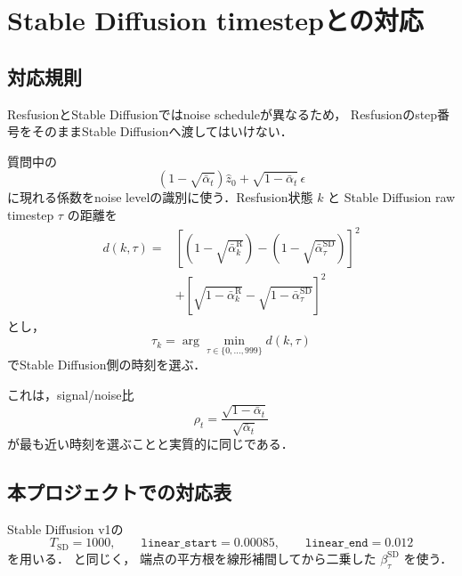 \documentclass[11pt,a4paper]{ltjsarticle}
\begin{document}
\section{Stable Diffusion timestepとの対応}

\subsection{対応規則}

ResfusionとStable Diffusionではnoise scheduleが異なるため，
Resfusionのstep番号をそのままStable Diffusionへ渡してはいけない．

質問中の
\[
  \left(1-\sqrt{\bar\alpha_t}\right)\hat z_0
  +
  \sqrt{1-\bar\alpha_t}\,\epsilon
\]
に現れる係数をnoise levelの識別に使う．Resfusion状態 \(k\) と
Stable Diffusion raw timestep \(\tau\) の距離を
\begin{equation}
\begin{aligned}
d(k,\tau)
={}&
\left[
  \left(1-\sqrt{\bar\alpha^{\mathrm R}_k}\right)
  -
  \left(1-\sqrt{\bar\alpha^{\mathrm{SD}}_\tau}\right)
\right]^2\\
&+
\left[
  \sqrt{1-\bar\alpha^{\mathrm R}_k}
  -
  \sqrt{1-\bar\alpha^{\mathrm{SD}}_\tau}
\right]^2
\end{aligned}
\label{eq:distance}
\end{equation}
とし，
\begin{equation}
\boxed{
  \tau_k
  =
  \arg\min_{\tau\in\{0,\ldots,999\}}d(k,\tau)
}
\label{eq:mapping}
\end{equation}
でStable Diffusion側の時刻を選ぶ．

これは，signal/noise比
\[
  \rho_t
  =
  \frac{\sqrt{1-\bar\alpha_t}}
       {\sqrt{\bar\alpha_t}}
\]
が最も近い時刻を選ぶことと実質的に同じである．

\subsection{本プロジェクトでの対応表}

Stable Diffusion v1の
\[
  T_{\mathrm{SD}}=1000,\qquad
  \texttt{linear\_start}=0.00085,\qquad
  \texttt{linear\_end}=0.012
\]
を用いる．
 と同じく，
端点の平方根を線形補間してから二乗した \(\beta_\tau^{\mathrm{SD}}\) を使う．
\end{document}
